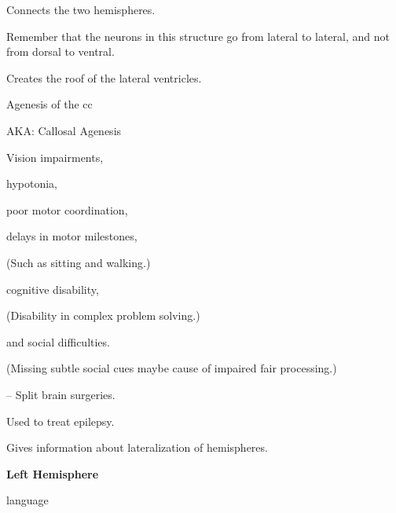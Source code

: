 \begin{coloredlist}
    \item {}
    \begin{coloredlist}
        \item Connects the two hemispheres.
        \item Remember that the neurons in this structure go from lateral to lateral, and not from dorsal to ventral.
        \item Creates the roof of the lateral ventricles.
        \item Agenesis of the cc
        \begin{coloredlist}
            \item AKA: Callosal Agenesis
            \item Vision impairments,
            \item hypotonia,
            \item poor motor coordination,
            \item delays in motor milestones,
            \begin{coloredlist}
                \item (Such as sitting and walking.)
            \end{coloredlist}
            \item cognitive disability,
            \begin{coloredlist}
                \item (Disability in complex problem solving.)
            \end{coloredlist}
            \item and social difficulties.
            \begin{coloredlist}
                \item (Missing subtle social cues maybe cause of impaired fair processing.)
            \end{coloredlist}
        \end{coloredlist}
        \item {} -- Split brain surgeries.
        \begin{coloredlist}
            \item Used to treat epilepsy.
            \item Gives information about lateralization of hemispheres.
            \item \textbf{Left Hemisphere}
            \begin{coloredlist}
                \item language

\end{coloredlist}
\end{coloredlist}
\end{coloredlist}
\end{coloredlist}
